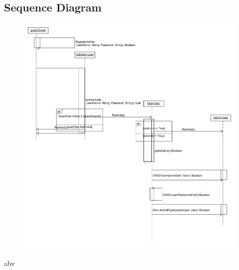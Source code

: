 \subsection{Sequence Diagram}
\begin{figure}[H]
	\includegraphics[width=\textwidth]{User_Management/Sequence_Diagram_User_Management.png}
\end{figure}


abv

